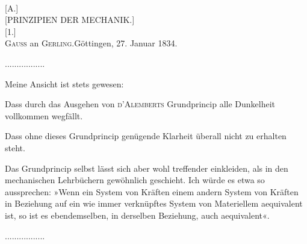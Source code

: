 \clearpage\begingroup\NoSourceHead{}
\begin{center}
{\Large{}}\\[1.5em]
[A.]\\[.8em]
[PRINZIPIEN DER MECHANIK.]\\[1.2em]
[1.]\\[.7em]
\textsc{Gauss} an \textsc{Gerling}.\quad Göttingen, 27. Januar 1834.
\end{center}
\noindent .\enspace.\enspace.\enspace.\enspace.\enspace.\enspace.\enspace.\enspace.\enspace.\enspace.\enspace.\enspace.\enspace.\enspace.\enspace.\enspace.
\par\noindent\hspace*{\parindent}Meine Ansicht ist stets gewesen:
\begin{list}{}{\setlength{\leftmargin}{1.5em}\setlength{\labelwidth}{1.2em}\setlength{\labelsep}{.3em}\setlength{\itemsep}{0pt}\setlength{\parsep}{0pt}\setlength{\topsep}{0pt}}
\item[1)] Dass durch das Ausgehen von \textsc{d’Alemberts} Grundprincip alle Dunkelheit
vollkommen wegfällt.
\item[2)] Dass ohne dieses Grundprincip genügende Klarheit überall nicht zu erhalten
steht.
\end{list}
\noindent Das Grundprincip selbst lässt sich aber wohl treffender einkleiden, als in den
mechanischen Lehrbüchern gewöhnlich geschieht. Ich würde es etwa so aussprechen:
»Wenn ein System von Kräften einem andern System von Kräften
in Beziehung auf ein wie immer verknüpftes System von Materiellem 
aequivalent ist, so ist es ebendemselben, in derselben Beziehung, auch 
aequivalent«.
\par\noindent .\enspace.\enspace.\enspace.\enspace.\enspace.\enspace.\enspace.\enspace.\enspace.\enspace.\enspace.\enspace.\enspace.\enspace.\enspace.\enspace.
\par\clearpage\endgroup
